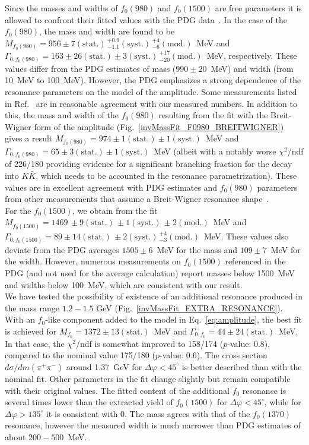 Since the masses and widths of $f_0(980)$ and $f_0(1500)$ are free parameters it is allowed to confront their fitted values with the PDG data~\cite{pdg}. In the case of the $f_0(980)$, the mass and width are found to be $M_{f_0(980)}=956 \pm 7 (\text{stat.})\,^{+0.9}_{-1.1} (\text{syst.})\,^{+4}_{-6} (\text{mod.})$~MeV and $\Gamma_{0,f_0(980)} = 163 \pm 26 (\text{stat.}) \pm 3 (\text{syst.})\,^{+17}_{-20} (\text{mod.})$~MeV, respectively. These values differ from the PDG estimates of mass ($990 \pm 20$~MeV) and width (from 10~MeV to 100~MeV). However, the PDG emphasizes a strong dependence of the resonance parameters on the model of the amplitude. Some measurements listed in Ref.~\cite{pdg} are in reasonable agreement with our measured numbers. In addition to this, the mass and width of the $f_0(980)$ resulting from the fit with the Breit-Wigner form of the amplitude (Fig.~\ref{invMassFit_F0980_BREITWIGNER}) gives a result $M_{f_0(980)}=974 \pm 1 (\text{stat.}) \pm 1 (\text{syst.})$~MeV and $\Gamma_{0,f_0(980)} = 65 \pm 3 (\text{stat.}) \pm 1 (\text{syst.})$~MeV (albeit with a notably worse $\chi^{2}$/ndf of 226/180 providing evidence for a significant branching fraction for the decay into $K\bar{K}$, which needs to be accounted in the resonance parametrization). These values are in excellent agreement with PDG estimates and $f_0(980)$ parameters from other measurements that assume a Breit-Wigner resonance shape~\cite{pdg}. \\
%
\indent
For the $f_0(1500)$, we obtain from the fit $M_{f_0(1500)} = 1469\,\pm 9 (\text{stat.})\,\pm 1 (\text{syst.})\,\pm 2 (\text{mod.})$~MeV and $\Gamma_{0,f_0(1500)} = 89 \pm 14 (\text{stat.})\,\pm 2 (\text{syst.})\,^{+4}_{-3} (\text{mod.})$~MeV. These values also deviate from the PDG averages $1505\pm 6$~MeV for the mass and $109\pm 7$~MeV for the width. However, numerous measurements on $f_{0}(1500)$ referenced in the PDG (and not used for the average calculation) report masses below 1500~MeV and widths below 100~MeV, which are consistent with our result. \\
%
\indent
We have tested the possibility of existence of an additional resonance produced in the mass range $1.2-1.5$ GeV (Fig.~\ref{invMassFit_EXTRA_RESONANCE}). With an $f_0$-like component added to the model in Eq.~\eqref{eq:amplitude}, the best fit is achieved for $M_{f_0}=1372 \pm 13 (\text{stat.})$~MeV and $\Gamma_{0,f_0} = 44 \pm 24 (\text{stat.})$~MeV. In that case, the $\chi^{2}$/ndf is somewhat improved to 158/174 ($p$-value: 0.8), compared to the nominal value 175/180 ($p$-value: 0.6). The cross section $d\sigma/dm(\pi^{+}\pi^{-})$ around 1.37~GeV for $\Delta\varphi<45^{\circ}$ is better described than with the nominal fit. Other parameters in the fit change slightly but remain compatible with their original values. The fitted content of the additional $f_0$ resonance is several times lower than the extracted yield of $f_0(1500)$ for $\Delta\varphi<45^{\circ}$, while for $\Delta\varphi>135^{\circ}$ it is consistent with 0. The mass agrees with that of the $f_{0}(1370)$ resonance, however the measured width is much narrower than PDG estimates of about $200-500$~MeV. \\


